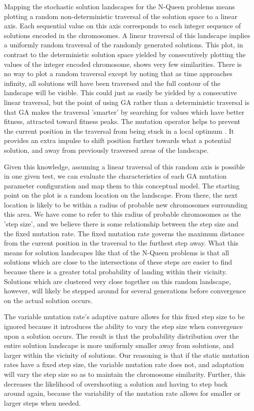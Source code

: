 \documentclass[conference]{IEEEtran}
\begin{document}
Mapping the stochastic solution landscapes for the N-Queen problems means plotting a random non-deterministic traversal of the solution space to a linear axis. Each sequential value on this axis corresponds to each integer sequence of solutions encoded in the chromosomes. A linear traversal of this landscape implies a uniformly random traversal of the randomly generated solutions. This plot, in contrast to the deterministic solution space yielded by consecutively plotting the values of the integer encoded chromosome, shows very few similarities. There is no way to plot a random traversal except by noting that as time approaches infinity, all solutions will have been traversed and the full contour of the landscape will be visible. This could just as easily be yielded by a consecutive linear traversal, but the point of using GA rather than a deterministic traversal is that GA makes the traversal 'smarter' by searching for values which have better fitness, attracted toward fitness peaks\cite{srinivas1994genetic}. The mutation operator helps to prevent the current position in the traversal from being stuck in a local optimum \cite{ye2010some}. It provides an extra impulse to shift position further towards what a potential solution, and away from previously traversed areas of the landscape.

Given this knowledge, assuming a linear traversal of this random axis is possible in one given test, we can evaluate the characteristics of each GA mutation parameter configuration and map them to this conceptual model. The starting point on the plot is a random location on the landscape. From there, the next location is likely to be within a radius of probable new chromosomes surrounding this area. We have come to refer to this radius of probable chromosomes as the 'step size', and we believe there is some relationship between the step size and the fixed mutation rate. The fixed mutation rate governs the maximum distance from the current position in the traversal to the furthest step away. What this means for solution landscapes like that of the N-Queen problems is that all solutions which are close to the intersections of these steps are easier to find because there is a greater total probability of landing within their vicinity. Solutions which are clustered very close together on this random landscape, however, will likely be stepped around for several generations before convergence on the actual solution occurs.

The variable mutation rate's adaptive nature allows for this fixed step size to be ignored because it introduces the ability to vary the step size when convergence upon a solution occurs. The result is that the probability distribution over the entire solution landscape is more uniformly smaller away from solutions, and larger within the vicinity of solutions. Our reasoning is that if the static mutation rates have a fixed step size, the variable mutation rate does not, and adaptation will vary the step size so as to maintain the chromosome similarity. Further, this decreases the likelihood of overshooting a solution and having to step back around again, because the variability of the mutation rate allows for smaller or larger steps when needed.
\end{document}
